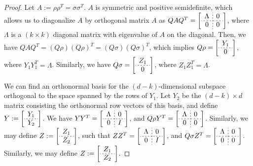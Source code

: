 \documentclass{article}
\begin{document}
\begin{proof}
Let $A:=\rho\rho^T=\sigma\sigma^T$. $A$ is symmetric and positive semidefinite, which allows us to diagonalize $A$ by orthogonal matrix $A$ as 
$QAQ^T=\left[
    \begin{array}{c;{2pt/2pt}c}
        \Lambda & 0 \\ \hdashline[2pt/2pt]
        0 & 0 
    \end{array}
\right]
$,
where $\Lambda$ is a $(k\times k)$ diagonal matrix with eigenvalue of $A$ on the diagonal. Then, we have $QAQ^T=(Q\rho)(Q\rho)^T=(Q\sigma)(Q\sigma)^T$, which implies 
$Q\rho=\left[
    \begin{array}{c}
        Y_1 \\ \hdashline[2pt/2pt]
        0
    \end{array}
\right]
$,
where $Y_1Y_1^T=\Lambda$. Similarly, we have 
$Q\sigma=\left[
    \begin{array}{c}
        Z_1 \\ \hdashline[2pt/2pt]
        0
    \end{array}
\right]
$,
where $Z_1Z_1^T=\Lambda$. 

We can find an orthonormal basis for the $(d-k)$-dimensional subspace orthogonal to the space spanned by the rows of $Y_1$. Let $Y_2$ be the $(d-k)\times d$ matrix consisting the orthonormal row vectors of this basis, and define 
$Y:=\left[
    \begin{array}{c}
        Y_1 \\ \hdashline[2pt/2pt]
        Y_2
    \end{array}
\right]
$. We have 
$YY^T=\left[
    \begin{array}{c;{2pt/2pt}c}
        \Lambda & 0 \\ \hdashline[2pt/2pt]
        0 & I 
    \end{array}
\right]
$, and 
$Q\rho Y^T=\left[
    \begin{array}{c;{2pt/2pt}c}
        \Lambda & 0 \\ \hdashline[2pt/2pt]
        0 & 0 
    \end{array}
\right]
$. Similarly, we may define 
$Z:=\left[
    \begin{array}{c}
        Z_1 \\ \hdashline[2pt/2pt]
        Z_2
    \end{array}
\right]
$, such that 
$ZZ^T=\left[
    \begin{array}{c;{2pt/2pt}c}
        \Lambda & 0 \\ \hdashline[2pt/2pt]
        0 & I 
    \end{array}
\right]
$, and 
$Q\sigma Z^T=\left[
    \begin{array}{c;{2pt/2pt}c}
        \Lambda & 0 \\ \hdashline[2pt/2pt]
        0 & 0 
    \end{array}
\right]
$. Similarly, we may define 
$Z:=\left[
    \begin{array}{c}
        Z_1 \\ \hdashline[2pt/2pt]
        Z_2
    \end{array}
\right]
$. 


\end{proof}
\end{document}
